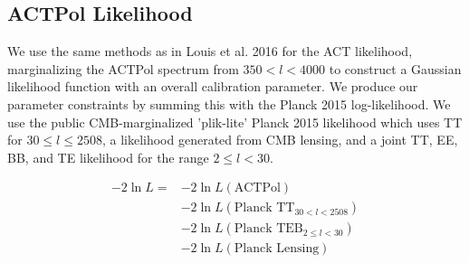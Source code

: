 \documentclass[11pt,a4paper]{emulateapj}
\begin{document}


\subsection{ACTPol Likelihood}

We use the same methods as in Louis et al. 2016 for the ACT likelihood, marginalizing the ACTPol spectrum from $350 < l < 4000$ to construct a Gaussian likelihood function with an overall calibration parameter. We produce our parameter constraints by summing this with the Planck 2015 log-likelihood. We use the public CMB-marginalized 'plik-lite' Planck 2015 likelihood which uses TT for $30 \leq l \leq 2508$, a likelihood generated from CMB lensing, and a joint TT, EE, BB, and TE likelihood for the range $2 \leq l < 30$. 

\begin{align}
-2 \ln L = &- 2 \ln L(\text{ACTPol}) \\
&-2 \ln L(\text{Planck TT}_{30 < l < 2508}) \\ 
&-2 \ln L(\text{Planck TEB}_{2 \leq l < 30})\\ 
&-2 \ln L(\text{Planck Lensing})
\end{align}
\end{document}
